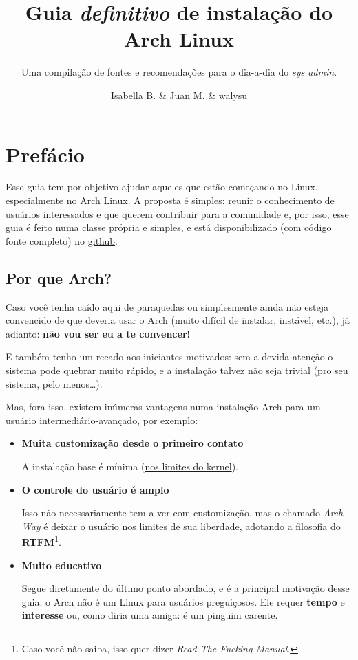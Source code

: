 \documentclass[dark, index]{Iart}
\title{Guia \textit{definitivo} de instalação do \textbf{\color{theme}Arch Linux} \arch}
\subtitle{Uma compilação de fontes e recomendações para o dia-a-dia do \textit{sys admin}.}
\author{Isabella B. \email{isabellabdoamaral@usp.br} \& Juan M. \email{seu@email.com} \& walysu \email{seu@tbm.br}}
\begin{document}
	
	\maketitle
	
	\chapter*{Prefácio}

  Esse guia tem por objetivo ajudar aqueles que estão começando no Linux, especialmente no Arch Linux. A proposta é simples: reunir o conhecimento de usuários interessados e que querem contribuir para a comunidade e, por isso, esse guia é feito numa classe própria e simples, e está disponibilizado (com código fonte completo) no \href{github.com/isab4147/archguide}{github}.

  \section*{Por que Arch?}

  Caso você tenha caído aqui de paraquedas ou simplesmente ainda não esteja convencido de que deveria usar o Arch (muito difícil de instalar, instável, etc.), já adianto: \textbf{não vou ser eu a te convencer!}
  
  E também tenho um recado aos iniciantes motivados: sem a devida atenção o sistema pode quebrar muito rápido, e a instalação talvez não seja trivial (pro seu sistema, pelo menos\ldots).

  Mas, fora isso, existem inúmeras vantagens numa instalação Arch para um usuário intermediário-avançado, por exemplo:
  \begin{itemize}
    \item \textbf{Muita customização desde o primeiro contato}
      
      A instalação base é mínima (\hyperref[subs:kernelIntro]{nos limites do kernel}). 
    \item \textbf{O controle do usuário é amplo}

      Isso não necessariamente tem a ver com customização, mas o chamado \textit{Arch Way} é deixar o usuário nos limites de sua liberdade, adotando a filosofia do \textbf{RTFM}\footnote{Caso você não saiba, isso quer dizer \textit{Read The Fucking Manual}.}.
    \item \textbf{Muito educativo}
      
      Segue diretamente do último ponto abordado, e é a principal motivação desse guia: o Arch não é um Linux para usuários preguiçosos. Ele requer \textbf{tempo} e \textbf{interesse} ou, como diria uma amiga: é um pinguim carente. 
  \end{itemize}
\end{document}
